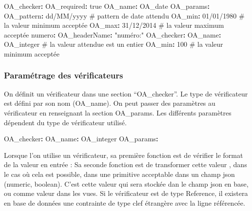 \documentclass[
  letterpaper,
  DIV=11,
  numbers=noendperiod]{scrartcl}
\newenvironment{Shaded}{\begin{snugshade}}{\end{snugshade}}
\newcommand{\AttributeTok}[1]{\textcolor[rgb]{0.40,0.45,0.13}{#1}}
\newcommand{\CharTok}[1]{\textcolor[rgb]{0.13,0.47,0.30}{#1}}
\newcommand{\CommentTok}[1]{\textcolor[rgb]{0.37,0.37,0.37}{#1}}
\newcommand{\DecValTok}[1]{\textcolor[rgb]{0.68,0.00,0.00}{#1}}
\newcommand{\FunctionTok}[1]{\textcolor[rgb]{0.28,0.35,0.67}{#1}}
\newcommand{\KeywordTok}[1]{\textcolor[rgb]{0.00,0.23,0.31}{\textbf{#1}}}
\newcommand{\StringTok}[1]{\textcolor[rgb]{0.13,0.47,0.30}{#1}}
\begin{document}
\begin{Shaded}
\begin{Highlighting}[]
\AttributeTok{        }\FunctionTok{OA\_checker}\KeywordTok{:}
\AttributeTok{            }\FunctionTok{OA\_required}\KeywordTok{:}\AttributeTok{ }\CharTok{true}
\AttributeTok{            }\FunctionTok{OA\_name}\KeywordTok{:}\AttributeTok{ OA\_date}
\AttributeTok{            }\FunctionTok{OA\_params}\KeywordTok{:}
\AttributeTok{            }\FunctionTok{OA\_pattern}\KeywordTok{:}\AttributeTok{ dd/MM/yyyy}\CommentTok{ \# pattern de date attendu}
\AttributeTok{            }\FunctionTok{OA\_min}\KeywordTok{:}\AttributeTok{ 01/01/1980}\CommentTok{ \# la valeur minimum acceptée}
\AttributeTok{            }\FunctionTok{OA\_max}\KeywordTok{:}\AttributeTok{ 31/12/2014}\CommentTok{ \# la valeur maximum acceptée}
\AttributeTok{      }\FunctionTok{numero}\KeywordTok{:}
\AttributeTok{        }\FunctionTok{OA\_headerName}\KeywordTok{:}\AttributeTok{ }\StringTok{"numéro:"}
\AttributeTok{        }\FunctionTok{OA\_checker}\KeywordTok{:}
\AttributeTok{          }\FunctionTok{OA\_name}\KeywordTok{:}\AttributeTok{ OA\_integer}\CommentTok{ \# la valeur attendue est un entier}
\AttributeTok{          }\FunctionTok{OA\_min}\KeywordTok{:}\AttributeTok{ }\DecValTok{100}\CommentTok{ \# la valeur minimum acceptée}
\end{Highlighting}
\end{Shaded}

\subsubsection{Paramétrage des
vérificateurs}\label{paramuxe9trage-des-vuxe9rificateurs}

On définit un vérificateur dans une section ``OA\_checker''. Le type de
vérificateur est défini par son nom (OA\_name). On peut passer des
paramètres au vérificateur en renseignant la section OA\_params. Les
différents paramètres dépendent du type de vérificateur utilisé.

\begin{Shaded}
\begin{Highlighting}[]
\AttributeTok{    }\FunctionTok{OA\_checker}\KeywordTok{:}
\AttributeTok{        }\FunctionTok{OA\_name}\KeywordTok{:}\AttributeTok{ OA\_integer}
\AttributeTok{        }\FunctionTok{OA\_params}\KeywordTok{:}\AttributeTok{ }
\end{Highlighting}
\end{Shaded}

Lorsque l'on utilise un vérificateur, sa première fonction est de
vérifier le format de la valeur en entrée : Sa seconde fonction est de
transformer cette valeur , dans le cas où cela est possible, dans une
primitive acceptable dans un champ json (numeric, boolean). C'est cette
valeur qui sera stockée dan le champ json en base, ou comme valeur dans
les vues. Si le vérificateur est de type Reference, il existera en base
de données une contrainte de type clef étrangère avec la ligne
référencée.
\end{document}
